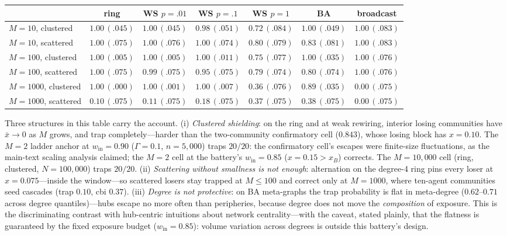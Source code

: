 \documentclass[11pt]{article}
\newcommand{\1}{\mathbf{1}}
\begin{document}
\begin{center}
\small
\begin{tabular}{lcccccc}
\hline
 & ring & WS $p{=}.01$ & WS $p{=}.1$ & WS $p{=}1$ & BA & broadcast \\
\hline
$M{=}10$, clustered & $1.00\,(.045)$ & $1.00\,(.045)$ & $0.98\,(.051)$ & $0.72\,(.084)$ & $1.00\,(.049)$ & $1.00\,(.083)$ \\
$M{=}10$, scattered & $1.00\,(.075)$ & $1.00\,(.076)$ & $1.00\,(.074)$ & $0.80\,(.079)$ & $0.83\,(.081)$ & $1.00\,(.083)$ \\
$M{=}100$, clustered & $1.00\,(.005)$ & $1.00\,(.005)$ & $1.00\,(.011)$ & $0.75\,(.077)$ & $1.00\,(.035)$ & $1.00\,(.076)$ \\
$M{=}100$, scattered & $1.00\,(.075)$ & $0.99\,(.075)$ & $0.95\,(.075)$ & $0.79\,(.074)$ & $0.80\,(.074)$ & $1.00\,(.076)$ \\
$M{=}1000$, clustered & $1.00\,(.000)$ & $1.00\,(.001)$ & $1.00\,(.007)$ & $0.36\,(.076)$ & $0.89\,(.035)$ & $0.00\,(.075)$ \\
$M{=}1000$, scattered & $0.10\,(.075)$ & $0.11\,(.075)$ & $0.18\,(.075)$ & $0.37\,(.075)$ & $0.38\,(.075)$ & $0.00\,(.075)$ \\
\hline
\end{tabular}
\end{center}

\noindent Three structures in this table carry the account. (i) \emph{Clustered shielding}: on the ring and at weak rewiring, interior losing communities have $\bar x\to0$ as $M$ grows, and trap completely---harder than the two-community confirmatory cell ($0.843$), whose losing block has $x=0.10$. The $M{=}2$ ladder anchor at $w_{\mathrm{in}}=0.90$ ($\Gamma=0.1$, $n=5{,}000$) traps $20/20$: the confirmatory cell's escapes were finite-size fluctuations, as the main-text scaling analysis claimed; the $M{=}2$ cell at the battery's $w_{\mathrm{in}}=0.85$ ($x=0.15>x_B$) corrects. The $M{=}10{,}000$ cell (ring, clustered, $N=100{,}000$) traps $20/20$. (ii) \emph{Scattering without smallness is not enough}: alternation on the degree-4 ring pins every loser at $x=0.075$---inside the window---so scattered losers stay trapped at $M\le100$ and correct only at $M=1000$, where ten-agent communities seed cascades (trap $0.10$, cbi $0.37$). (iii) \emph{Degree is not protective}: on BA meta-graphs the trap probability is flat in meta-degree ($0.62$--$0.71$ across degree quantiles)---hubs escape no more often than peripheries, because degree does not move the \emph{composition} of exposure. This is the discriminating contrast with hub-centric intuitions about network centrality---with the caveat, stated plainly, that the flatness is guaranteed by the fixed exposure budget ($w_{\mathrm{in}}=0.85$): volume variation across degrees is outside this battery's design.
\end{document}
